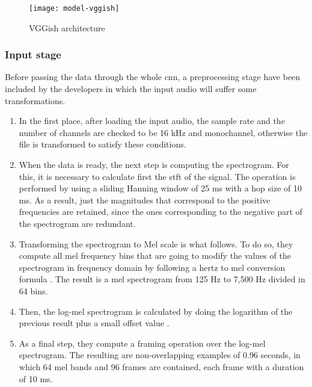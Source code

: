 	\begin{figure}
		\centering
		\captionsetup{justification=centering}
		\texttt{[image: model-vggish]}
		\caption{VGGish architecture}
		\label{fig:mesh2}
	\end{figure}

	\subsubsection*{Input stage}
	
	Before passing the data through the whole \acrshort{cnn}, a preprocessing stage have been included by the developers in which the input audio will suffer some transformations. 
	
	\begin{enumerate}
	\item In the first place, after loading the input audio, the sample rate and the number of channels are checked to be 16 kHz and monochannel, otherwise the file is transformed to satisfy these conditions.
	\item When the data is ready, the next step is computing the spectrogram. For this, it is necessary to calculate first the \acrfull{stft} of the signal. The operation is performed by using a sliding Hanning window of 25 ms with a hop size of 10 ms. As a result, just the magnitudes that correspond to the positive frequencies are retained, since the ones corresponding to the negative part of the spectrogram are redundant.  
	\item  Transforming the spectrogram to Mel scale is what follows. To do so, they compute all mel frequency bins that are going to modify the values of the spectrogram in frequency domain by following a hertz to mel conversion formula . The result is a mel spectrogram from 125 Hz to 7,500 Hz divided in 64 bins.
	\item Then, the log-mel spectrogram is calculated by doing the logarithm of the previous result plus a small offset value .
	\item As a final step, they compute a framing operation over the log-mel spectrogram. The resulting are non-overlapping examples of 0.96 seconds, in which 64 mel bands and 96 frames are contained, each frame with a duration of 10 ms.
	\end{enumerate}

